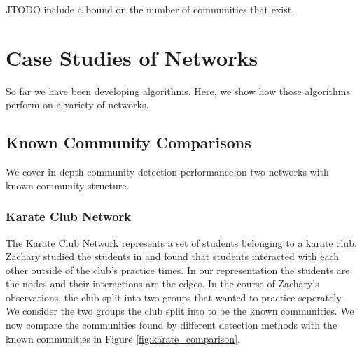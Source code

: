\documentclass[phd,tocprelim]{cornell}
\begin{document}
JTODO include a bound on the number of communities that exist.


\chapter{Case Studies of Networks}
\label{ch:datasets}

So far we have been developing algorithms.  Here, we show how those algorithms perform on a variety of networks.


\section{Known Community Comparisons}

We cover in depth community detection performance on two networks with known community structure.

\subsection{Karate Club Network}

The Karate Club Network represents a set of students belonging to a karate club.  Zachary studied the students in \cite{zachary} and found that students interacted with each other outside of the club's practice times.  In our representation the students are the nodes and their interactions are the edges.  In the course of Zachary's observations, the club split into two groups that wanted to practice seperately.  We consider the two groups the club split into to be the known communities.  We now compare the communities found by different detection methods with the known communities in Figure \ref{fig:karate_comparison}.
\end{document}
